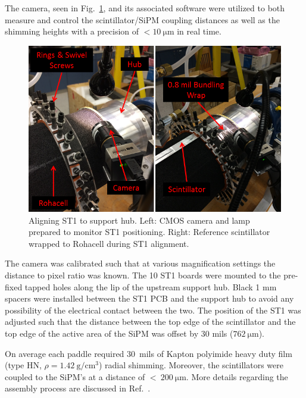 The camera, seen in Fig.~\ref{fig:aligning_st1_to_hub}, and its associated software were utilized to both measure and control the scintillator/SiPM coupling distances as well as the shimming heights with a precision of $\mathrm{< 10\ \mu m}$ in real time. 
	\begin{figure}[!htb]
		\centering
		\includegraphics[width=1.0\columnwidth]{fabrication/figs/aligning_st1_to_hub}
		\caption{Aligning ST1 to support hub.  Left: CMOS camera and lamp prepared to monitor ST1 positioning.  Right: Reference scintillator wrapped to Rohacell during ST1 alignment.}
		\label{fig:aligning_st1_to_hub}
	\end{figure}
The camera was calibrated such that at various magnification settings the distance to pixel ratio was known.  The 10 ST1 boards were mounted to the pre-fixed tapped holes along the lip of the upstream support hub.  Black 1 mm spacers were installed between the ST1 PCB and the support hub to avoid any possibility of the electrical contact between the two.  The position of the ST1 was adjusted such that the distance between the top edge of the scintillator and the top edge of the active area of the SiPM was offset by 30 mils ($\mathrm{762\ \mu m}$).  %



On average each paddle required 30~mils of Kapton polyimide heavy duty film (type HN, $\rho = 1.42\ \mathrm{g/cm^{3}}$) radial shimming.  Moreover, the scintillators were coupled to the SiPM's at a distance of $\mathrm{<\ 200\ \mu m}$.  More details regarding the assembly process are discussed in Ref.~\cite{pooser16}.


